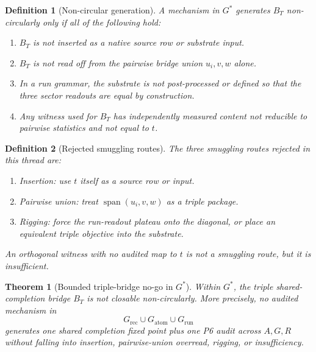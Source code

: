 \documentclass[11pt]{article}
\newtheorem{definition}{Definition}
\newtheorem{theorem}{Theorem}
\DeclareMathOperator{\spanop}{span}
\begin{document}
\begin{definition}[Non-circular generation]
A mechanism in \(G^*\) generates \(B_T\) non-circularly only if all of the
following hold:
\begin{enumerate}
\item \(B_T\) is not inserted as a native source row or substrate input.
\item \(B_T\) is not read off from the pairwise bridge union \(u_i,v,w\) alone.
\item In a run grammar, the substrate is not post-processed or defined so that
the three sector readouts are equal by construction.
\item Any witness used for \(B_T\) has independently measured content not
reducible to pairwise statistics and not equal to \(t\).
\end{enumerate}
\end{definition}

\begin{definition}[Rejected smuggling routes]
The three smuggling routes rejected in this thread are:
\begin{enumerate}
\item \emph{Insertion}: use \(t\) itself as a source row or input.
\item \emph{Pairwise union}: treat \(\spanop(u_i,v,w)\) as a triple package.
\item \emph{Rigging}: force the run-readout plateau onto the diagonal, or place
an equivalent triple objective into the substrate.
\end{enumerate}
An orthogonal witness with no audited map to \(t\) is not a smuggling route, but
it is insufficient.
\end{definition}

\begin{theorem}[Bounded triple-bridge no-go in \(G^*\)]
Within \(G^*\), the triple shared-completion bridge \(B_T\) is not closable
non-circularly.  More precisely, no audited mechanism in
\[
G_{\mathrm{rec}}\cup G_{\mathrm{atom}}\cup G_{\mathrm{run}}
\]
generates one shared completion fixed point plus one P6 audit across \(A,G,R\)
without falling into insertion, pairwise-union overread, rigging, or
insufficiency.
\end{theorem}
\end{document}
